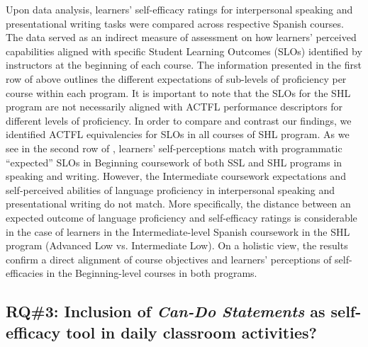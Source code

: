 \documentclass[output=paper]{langscibook}
\begin{document}
Upon data analysis, learners’ self-efficacy ratings for interpersonal speaking and presentational writing tasks were compared across respective Spanish courses. The data served as an indirect measure of assessment on how learners’ perceived capabilities aligned with specific Student Learning Outcomes (SLOs) identified by instructors at the beginning of each course. The information presented in the first row of  above outlines the different expectations of sub-levels of proficiency per course within each program. It is important to note that the SLOs for the SHL program are not necessarily aligned with ACTFL performance descriptors for different levels of proficiency. In order to compare and contrast our findings, we identified ACTFL equivalencies for SLOs in all courses of SHL program. As we see in the second row of , learners’ self-perceptions match with programmatic “expected” SLOs in Beginning coursework of both SSL and SHL programs in speaking and writing. However, the Intermediate coursework expectations and self-perceived abilities of language proficiency in interpersonal speaking and presentational writing do not match. More specifically, the distance between an expected outcome of language proficiency and self-efficacy ratings is considerable in the case of learners in the Intermediate-level Spanish coursework in the SHL program (Advanced Low vs. Intermediate Low). On a holistic view, the results confirm a direct alignment of course objectives and learners’ perceptions of self-efficacies in the Beginning-level courses in both programs.

\subsection{RQ\#3: Inclusion of \textit{Can-Do Statements} as self-efficacy tool in daily classroom activities?}
\end{document}
